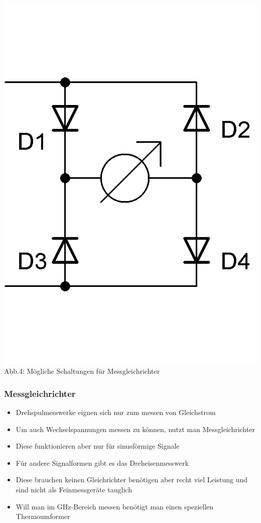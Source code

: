 \begin{frame}
\begin{center}
	\includegraphics[scale=1.3]{a16/Messgleichrichter2.png}\\
	Abb.4: Mögliche Schaltungen für Messgleichrichter	
	\end{center}
\end{frame}

\begin{frame}
\frametitle{Messgleichrichter}
	\begin{itemize}
		\item	Drehspulmesswerke eignen sich nur zum messen von Gleichstrom
		\item	Um auch Wechselspannungen messen zu können, nutzt man Messgleichrichter
		\item	Diese funktionieren aber nur für sinusförmige Signale
		\item	Für andere Signalformen gibt es das Dreheisenmesswerk
		\item	Diese brauchen keinen Gleichrichter benötigen aber recht viel Leistung und sind nicht als Feinmessgeräte tauglich
		\item	Will man im GHz-Bereich messen benötigt man einen speziellen Thermoumformer
	\end{itemize}		
\end{frame}

